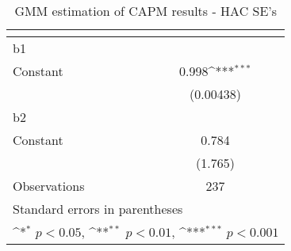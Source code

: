 \begin{table}[htbp]\centering
\def\sym#1{\ifmmode^{#1}\else\(^{#1}\)\fi}
\caption{GMM estimation of CAPM results - HAC SE's}
\begin{tabular}{l*{1}{c}}
\hline\hline
                    &\multicolumn{1}{c}{} \\
\hline
b1                  &                     \\
Constant            &       0.998\sym{***}\\
                    &   (0.00438)         \\
\hline
b2                  &                     \\
Constant            &       0.784         \\
                    &     (1.765)         \\
\hline
Observations        &         237         \\
\hline\hline
\multicolumn{2}{l}{\footnotesize Standard errors in parentheses}\\
\multicolumn{2}{l}{\footnotesize \sym{*} \(p<0.05\), \sym{**} \(p<0.01\), \sym{***} \(p<0.001\)}\\
\end{tabular}
\end{table}
